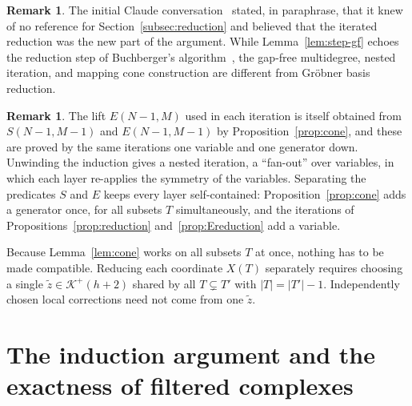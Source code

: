 \documentclass[12pt]{amsart}
\theoremstyle{definition}
\newtheorem{remark1}[theorem]{Remark}
\theoremstyle{remark}
\newcommand{\K}{\mathcal K}
\newcommand{\LL}{\mathcal K} %
\begin{document}
\begin{remark1}\label{rem:original}
The initial Claude conversation~\cite{claude-sonnet-2026-koszul} stated, in
paraphrase, that 
it knew of no reference for Section~\ref{subsec:reduction} %
and believed that the iterated reduction was the new part of the argument.
While Lemma~\ref{lem:step-gf} echoes the reduction step of
Buchberger's algorithm~\cite[Ch.~2, \S6, Thm.~6, and 
\S10, Thm.~6]{cox-little-oshea2025},
the gap-free multidegree, nested iteration,
and mapping cone construction are different from Gr\"obner basis reduction.
\end{remark1}

\begin{remark1}\label{rem:fanout} %
The lift $E(N-1, M)$ used in each iteration is itself obtained from
$S(N-1, M-1)$ and $E(N-1,M-1)$ by Proposition~\ref{prop:cone}, and these are
proved by the same iterations one variable and one generator down.
Unwinding the induction gives a nested iteration, a ``fan-out'' over
variables, in which each layer re-applies the symmetry of the
variables.  Separating the predicates $S$ and $E$ keeps every layer
self-contained: Proposition~\ref{prop:cone} adds a generator once, for all
subsets $T$ simultaneously, and the iterations of
Propositions~\ref{prop:reduction} and~\ref{prop:Ereduction} add a variable.


Because Lemma~\ref{lem:cone} works on all subsets $T$ at once, nothing has to be
made compatible.  Reducing each coordinate $X(T)$
separately requires choosing a single $\tilde z\in\LL^+(h+2)$
shared by all $T\subsetneq T'$ with $|T|=|T'|-1$.  Independently chosen local corrections need not
come from one $\tilde z$.
\end{remark1}




\section{The induction argument and the exactness of filtered complexes}\label{sec:induction}
\end{document}
